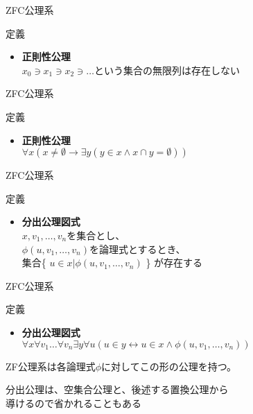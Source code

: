 \documentclass[17pt,aspectratio=169]{beamer}
\begin{document}
\begin{frame}{ZFC公理系}
    \begin{block}{定義}
        \begin{itemize}
            \item \textbf{正則性公理} \\
                  $x_0 \ni x_1 \ni x_2 \ni \dots$という集合の無限列は存在しない
        \end{itemize}
    \end{block}
\end{frame}

\begin{frame}{ZFC公理系}
    \begin{block}{定義}
        \begin{itemize}
            \item \textbf{正則性公理} \\
                  $\forall x (x \neq \emptyset \rightarrow \exists y (y \in x \land x \cap y = \emptyset))$
        \end{itemize}
    \end{block}
\end{frame}

\begin{frame}{ZFC公理系}
    \begin{block}{定義}
        \begin{itemize}
            \item \textbf{分出公理図式} \\
                  $x, v_1, \dots, v_n$を集合とし、\\
                  $\phi (u, v_1, \dots, v_n)$を論理式とするとき、\\
                  集合\{ $u \in x | \phi(u, v_1, \dots, v_n)$ \} が存在する
        \end{itemize}
    \end{block}

\end{frame}

\begin{frame}{ZFC公理系}
    \begin{block}{定義}
        \begin{itemize}
            \item \textbf{分出公理図式} \\
                  $\forall x \forall v_1 \dots \forall v_n \exists y \forall u (u \in y \leftrightarrow u \in x \land \phi(u, v_1, \dots, v_n))$
        \end{itemize}
        ZF公理系は各論理式$\phi$に対してこの形の公理を持つ。
    \end{block}

    分出公理は、空集合公理と、後述する置換公理から\\
    導けるので省かれることもある
\end{frame}
\end{document}
